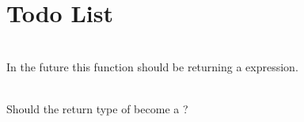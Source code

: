 \chapter{Todo List}
\hypertarget{todo}{}\label{todo}

\begin{DoxyRefList}
\item[Member \doxylink{class_eigen_1_1_transform_a41e2e58b09790eb8e3e220acceb7de1f}{Eigen\+::Transform\texorpdfstring{$<$}{<} \+\_\+\+Scalar, \+\_\+\+Dim, \+\_\+\+Mode, \+\_\+\+Options \texorpdfstring{$>$}{>}\+::Identity} ()]\hfill \\
\label{todo__todo000001}%
%
In the future this function should be returning a  expression.  
\item[Member \doxylink{group___geometry___module_ga033d6550c1fc82e232f2b4c380c19a54}{Eigen\+::umeyama} (const Matrix\+Base$<$ Derived $>$ \&src, const Matrix\+Base$<$ Other\+Derived $>$ \&dst, bool with\+\_\+scaling=true)]\hfill \\
\label{todo__todo000002}%
%
Should the return type of  become a ?
\end{DoxyRefList}
